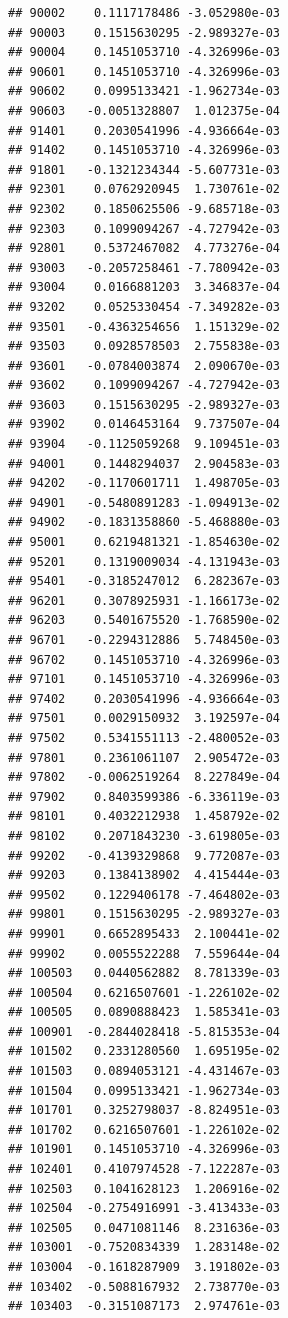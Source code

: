 \documentclass[ignorenonframetext,]{beamer}
\begin{document}
\begin{frame}[fragile]
\begin{verbatim}
## 90002    0.1117178486 -3.052980e-03
## 90003    0.1515630295 -2.989327e-03
## 90004    0.1451053710 -4.326996e-03
## 90601    0.1451053710 -4.326996e-03
## 90602    0.0995133421 -1.962734e-03
## 90603   -0.0051328807  1.012375e-04
## 91401    0.2030541996 -4.936664e-03
## 91402    0.1451053710 -4.326996e-03
## 91801   -0.1321234344 -5.607731e-03
## 92301    0.0762920945  1.730761e-02
## 92302    0.1850625506 -9.685718e-03
## 92303    0.1099094267 -4.727942e-03
## 92801    0.5372467082  4.773276e-04
## 93003   -0.2057258461 -7.780942e-03
## 93004    0.0166881203  3.346837e-04
## 93202    0.0525330454 -7.349282e-03
## 93501   -0.4363254656  1.151329e-02
## 93503    0.0928578503  2.755838e-03
## 93601   -0.0784003874  2.090670e-03
## 93602    0.1099094267 -4.727942e-03
## 93603    0.1515630295 -2.989327e-03
## 93902    0.0146453164  9.737507e-04
## 93904   -0.1125059268  9.109451e-03
## 94001    0.1448294037  2.904583e-03
## 94202   -0.1170601711  1.498705e-03
## 94901   -0.5480891283 -1.094913e-02
## 94902   -0.1831358860 -5.468880e-03
## 95001    0.6219481321 -1.854630e-02
## 95201    0.1319009034 -4.131943e-03
## 95401   -0.3185247012  6.282367e-03
## 96201    0.3078925931 -1.166173e-02
## 96203    0.5401675520 -1.768590e-02
## 96701   -0.2294312886  5.748450e-03
## 96702    0.1451053710 -4.326996e-03
## 97101    0.1451053710 -4.326996e-03
## 97402    0.2030541996 -4.936664e-03
## 97501    0.0029150932  3.192597e-04
## 97502    0.5341551113 -2.480052e-03
## 97801    0.2361061107  2.905472e-03
## 97802   -0.0062519264  8.227849e-04
## 97902    0.8403599386 -6.336119e-03
## 98101    0.4032212938  1.458792e-02
## 98102    0.2071843230 -3.619805e-03
## 99202   -0.4139329868  9.772087e-03
## 99203    0.1384138902  4.415444e-03
## 99502    0.1229406178 -7.464802e-03
## 99801    0.1515630295 -2.989327e-03
## 99901    0.6652895433  2.100441e-02
## 99902    0.0055522288  7.559644e-04
## 100503   0.0440562882  8.781339e-03
## 100504   0.6216507601 -1.226102e-02
## 100505   0.0890888423  1.585341e-03
## 100901  -0.2844028418 -5.815353e-04
## 101502   0.2331280560  1.695195e-02
## 101503   0.0894053121 -4.431467e-03
## 101504   0.0995133421 -1.962734e-03
## 101701   0.3252798037 -8.824951e-03
## 101702   0.6216507601 -1.226102e-02
## 101901   0.1451053710 -4.326996e-03
## 102401   0.4107974528 -7.122287e-03
## 102503   0.1041628123  1.206916e-02
## 102504  -0.2754916991 -3.413433e-03
## 102505   0.0471081146  8.231636e-03
## 103001  -0.7520834339  1.283148e-02
## 103004  -0.1618287909  3.191802e-03
## 103402  -0.5088167932  2.738770e-03
## 103403  -0.3151087173  2.974761e-03

\end{verbatim}
\end{frame}
\end{document}
